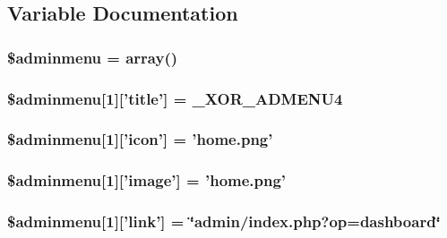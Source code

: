 \subsection{Variable Documentation}
\hypertarget{menu_8php_a9e95e7fdb7ca106c9d44e97430edef59}{
\subsubsection[{\$adminmenu}]{\setlength{\rightskip}{0pt plus 5cm}\$adminmenu = array()}}\label{menu_8php_a9e95e7fdb7ca106c9d44e97430edef59}
\hypertarget{menu_8php_aa4d95e2b8402adb7aac22031a76bf8ac}{
\subsubsection[{\$adminmenu}]{\setlength{\rightskip}{0pt plus 5cm}\$adminmenu\mbox{[}1\mbox{]}\mbox{[}'title'\mbox{]} = {\bf \-\_\-\-X\-O\-R\-\_\-\-A\-D\-M\-E\-N\-U4}}}\label{menu_8php_aa4d95e2b8402adb7aac22031a76bf8ac}
\hypertarget{menu_8php_a2bfe17f3051123a62497c4f163a989be}{
\subsubsection[{\$adminmenu}]{\setlength{\rightskip}{0pt plus 5cm}\$adminmenu\mbox{[}1\mbox{]}\mbox{[}'icon'\mbox{]} = 'home.\-png'}}\label{menu_8php_a2bfe17f3051123a62497c4f163a989be}
\hypertarget{menu_8php_a874680199c4b14f5e8fb1123a3bf24b6}{
\subsubsection[{\$adminmenu}]{\setlength{\rightskip}{0pt plus 5cm}\$adminmenu\mbox{[}1\mbox{]}\mbox{[}'image'\mbox{]} = 'home.\-png'}}\label{menu_8php_a874680199c4b14f5e8fb1123a3bf24b6}
\hypertarget{menu_8php_a8b18a24b489369490446d45ac2b617f7}{
\subsubsection[{\$adminmenu}]{\setlength{\rightskip}{0pt plus 5cm}\$adminmenu\mbox{[}1\mbox{]}\mbox{[}'link'\mbox{]} = \char`\"{}admin/index.\-php?op=dashboard\char`\"{}}}\label{menu_8php_a8b18a24b489369490446d45ac2b617f7}
